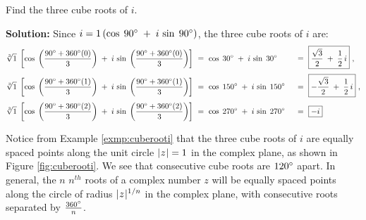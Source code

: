\begin{exmp}\label{exmp:cuberooti}
 Find the three cube roots of $i$.\vspace{1mm}
 \par\noindent\textbf{Solution:} Since $i = 1\,(\cos\;90^\circ \;+\; i\,\sin\;90^\circ)$, the
 three cube roots of $i$ are:
 \begin{alignat*}{3}
  \sqrt[3]{1} \;\left[ \cos\;\left(\frac{90^\circ + 360^\circ (0)}{3}\right) \;+\;
  i\,\sin\;\left(\frac{90^\circ + 360^\circ (0)}{3}\right) \right] ~&=~
  \cos\;30^\circ \;+\; i\,\sin\;30^\circ ~&&=~
  \boxed{\frac{\sqrt{3}}{2} \;+\; \frac{1}{2}\,i}~,\\[3pt]
  \sqrt[3]{1} \;\left[ \cos\;\left(\frac{90^\circ + 360^\circ (1)}{3}\right) \;+\;
  i\,\sin\;\left(\frac{90^\circ + 360^\circ (1)}{3}\right) \right] ~&=~
  \cos\;150^\circ \;+\; i\,\sin\;150^\circ ~&&=~
  \boxed{-\frac{\sqrt{3}}{2} \;+\; \frac{1}{2}\,i}~,\\[3pt]
  \sqrt[3]{1} \;\left[ \cos\;\left(\frac{90^\circ + 360^\circ (2)}{3}\right) \;+\;
  i\,\sin\;\left(\frac{90^\circ + 360^\circ (2)}{3}\right) \right] ~&=~
  \cos\;270^\circ \;+\; i\,\sin\;270^\circ ~&&=~ \boxed{-i}
 \end{alignat*}
\end{exmp}
\divider
\newpage
\piccaption[]{\label{fig:cuberooti}}
Notice from Example \ref{exmp:cuberooti} that the three cube roots of $i$ are equally spaced points
along the unit circle $\lvert\mspace{1mu}z\mspace{1mu}\rvert=1$ in the complex plane, as shown in Figure \ref{fig:cuberooti}.
We see that consecutive cube roots are $120^\circ$ apart.
In general, the $n$ $n^{th}$ roots of a complex number $z$ will be equally spaced points along the
circle of radius $\lvert\mspace{1mu}z\mspace{1mu}\rvert^{1/n}$ in the complex plane, with consecutive roots separated by
$\tfrac{360^\circ}{n}$.

